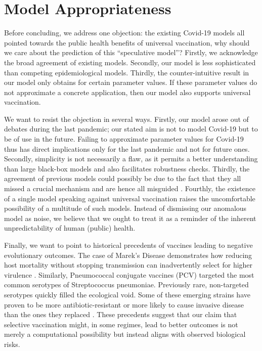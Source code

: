 \documentclass[a4paper,12pt]{article}
\begin{document}
\section{Model Appropriateness}\label{sec:Objection}
Before concluding, we address one objection: the existing Covid-19 models all pointed towards the public health benefits of universal vaccination, why should we care about the prediction of this ``speculative model''? Firstly, we acknowledge the broad agreement of existing models. Secondly, our model is less sophisticated than competing epidemiological models. Thirdly, the counter-intuitive result in our model only obtains for certain parameter values. If these parameter values do not approximate a concrete application, then our model also supports universal vaccination.

We want to resist the objection in several ways. Firstly, our model arose out of debates during the last pandemic; our stated aim is not to model Covid-19 but to be of use in the future. Failing to approximate parameter values for Covid-19 thus has direct implications only for the last pandemic and not for future ones. Secondly, simplicity is not necessarily a flaw, as it permits a better understanding than large black-box models and also facilitates robustness checks. Thirdly, the agreement of previous models could possibly be due to the fact that they all missed a crucial mechanism and are hence all misguided  . Fourthly, the existence of a single model speaking against universal vaccination raises the uncomfortable possibility of a multitude of such models. Instead of dismissing our anomalous model as noise, we believe that we ought to treat it as a reminder of the inherent unpredictability of human (public) health.

Finally, we want to point to historical precedents of vaccines leading to negative evolutionary outcomes. The case of Marek's Disease demonstrates how reducing host mortality without stopping transmission can inadvertently select for higher virulence \cite{Read2015}. Similarly, Pneumococcal conjugate vaccines (PCV) targeted the most common serotypes of Streptococcus pneumoniae. Previously rare, non-targeted serotypes quickly filled the ecological void. Some of these emerging strains have proven to be more antibiotic-resistant or more likely to cause invasive disease than the ones they replaced \cite{Hanquet2022}. These precedents suggest that our claim that selective vaccination might, in some regimes, lead to better outcomes is not merely a computational possibility but instead aligns with observed biological risks.
\end{document}
